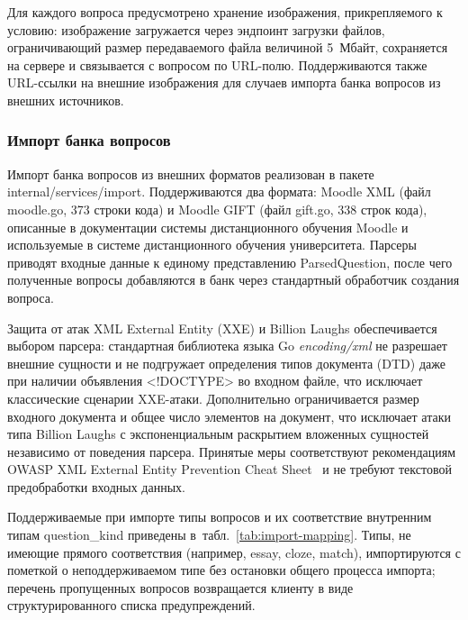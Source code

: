 Для каждого вопроса предусмотрено хранение изображения, прикрепляемого
к условию: изображение загружается через эндпоинт загрузки файлов,
ограничивающий размер передаваемого файла величиной 5~Мбайт,
сохраняется на сервере и связывается с вопросом по URL-полю.
Поддерживаются также URL-ссылки на внешние изображения для
случаев импорта банка вопросов из внешних источников.

\subsubsection{Импорт банка вопросов}

Импорт банка вопросов из внешних форматов реализован в пакете
internal/services/import. Поддерживаются два формата:
Moodle XML (файл moodle.go, 373 строки кода) и Moodle GIFT
(файл gift.go, 338 строк кода), описанные в документации
системы дистанционного обучения Moodle и используемые в системе
дистанционного обучения университета. Парсеры приводят входные
данные к единому представлению ParsedQuestion, после
чего полученные вопросы добавляются в банк через стандартный
обработчик создания вопроса.

Защита от атак XML External Entity (XXE) и Billion Laughs
обеспечивается выбором парсера: стандартная библиотека языка Go
\textit{encoding/xml} не разрешает внешние сущности и не подгружает
определения типов документа (DTD) даже при наличии объявления
\textless!DOCTYPE\textgreater{} во входном файле, что исключает
классические сценарии XXE-атаки. Дополнительно ограничивается
размер входного документа и общее число элементов на документ,
что исключает атаки типа Billion Laughs с экспоненциальным
раскрытием вложенных сущностей независимо от поведения парсера.
Принятые меры соответствуют рекомендациям OWASP XML External
Entity Prevention Cheat Sheet~\cite{owasp_xxe} и не требуют
текстовой предобработки входных данных.

Поддерживаемые при импорте типы вопросов и их соответствие
внутренним типам question\_kind приведены
в~табл.~\ref{tab:import-mapping}. Типы, не имеющие прямого
соответствия (например, essay, cloze,
match), импортируются с пометкой о неподдерживаемом типе
без остановки общего процесса импорта; перечень пропущенных
вопросов возвращается клиенту в виде структурированного списка
предупреждений.

